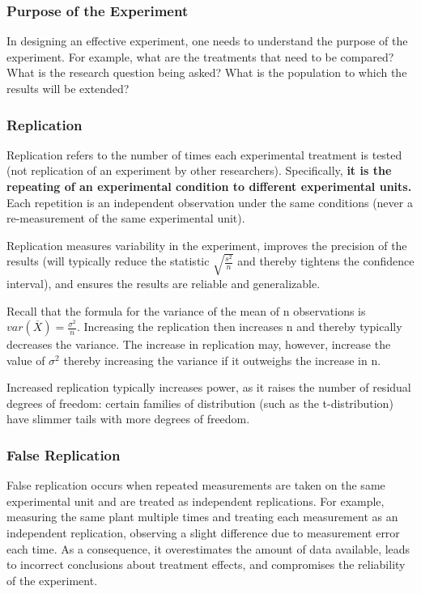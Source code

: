 \documentclass[12pt, oneside]{article}
\begin{document}
\subsubsection{Purpose of the Experiment}

In designing an effective experiment, one needs to understand the purpose of the experiment. For example, what are the treatments that need to be compared? What is the research question being asked? What is the population to which the results will be extended?

\subsubsection{Replication}

Replication refers to the number of times each experimental treatment is tested (not replication of an experiment by other researchers). Specifically, \textbf{it is the repeating of an experimental condition to different experimental units.} Each repetition is an independent observation under the same conditions (never a re-measurement of the same experimental unit).

Replication measures variability in the experiment, improves the precision of the results (will typically reduce the statistic $\sqrt{\frac{s^{2}}{n}}$ and thereby tightens the confidence interval), and ensures the results are reliable and generalizable. 



Recall that the formula for the variance of the mean of n observations is 
$var (\overline{X}) = \frac{\sigma^{2}}{n}.$ Increasing the replication then increases n and thereby 
typically decreases the variance. The increase in replication may, however, increase the value of $\sigma^{2}$ thereby 
increasing the variance if it outweighs the increase in n.

Increased replication typically increases power, as it raises the number of residual degrees of freedom: certain 
families of distribution (such as the t-distribution) have slimmer tails with more degrees of freedom. 

\subsubsection{False Replication}

False replication occurs when repeated measurements are taken on the same experimental unit and are treated as independent 
replications. For example, measuring the same plant multiple times and treating each measurement as an independent 
replication, observing a slight difference due to measurement error each time. As a consequence, it overestimates 
the amount of data available, leads to incorrect conclusions about treatment effects, and compromises the reliability of 
the experiment. 
\end{document}

